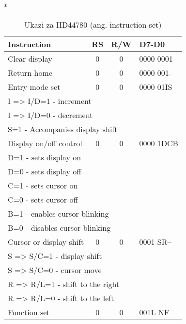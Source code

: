 \documentclass[12pt,a4paper,twoside,openright,slovene]{book}
\begin{document}
\begin{footnotesize}
    \begin{table}[h]
        \centering
        \caption{\label{instruction_set_HD44780} Ukazi za HD44780 (ang. instruction set)}
        ~\\*\begin{tabular}{lccl} \hline
            Instruction                                 & RS    & R/W   & D7-D0     \\ \hline \hline
            Clear display                               & 0     & 0     & 0000 0001 \\ \hline
            Return home                                 & 0     & 0     & 0000 001- \\ \hline
            Entry mode set                              & 0     & 0     & 0000 01IS \\
              \multicolumn{3}{l}{\quad I => I/D=1 - increment } \\
              \multicolumn{3}{l}{\quad I => I/D=0 - decrement} \\
              \multicolumn{3}{l}{\quad S=1 - Accompanies display shift} \\ \hline
            Display on/off control                      & 0     & 0     & 0000 1DCB \\
              \multicolumn{3}{l}{\quad D=1 - sets display on} \\
              \multicolumn{3}{l}{\quad D=0 - sets display off} \\
              \multicolumn{3}{l}{\quad C=1 - sets cursor on }\\
              \multicolumn{3}{l}{\quad C=0 - sets cursor off }\\
              \multicolumn{3}{l}{\quad B=1 - enables cursor blinking }\\
              \multicolumn{3}{l}{\quad B=0 - disables cursor blinking} \\ \hline
            Cursor or display shift                     & 0     & 0     &   0001 SR-- \\
              \multicolumn{3}{l}{\quad S => S/C=1 - display shift} \\
              \multicolumn{3}{l}{\quad S => S/C=0 - cursor move} \\
              \multicolumn{3}{l}{\quad R => R/L=1 - shift to the right} \\
              \multicolumn{3}{l}{\quad R => R/L=0 - shift to the left} \\ \hline
            Function set                                & 0     & 0     & 001L NF-- \\

\end{tabular}
\end{table}
\end{footnotesize}
\end{document}
